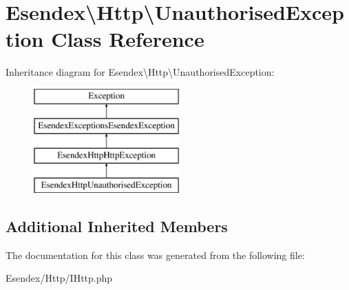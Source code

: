 \section{Esendex\textbackslash{}Http\textbackslash{}Unauthorised\-Exception Class Reference}
\label{class_esendex_1_1_http_1_1_unauthorised_exception}
Inheritance diagram for Esendex\textbackslash{}Http\textbackslash{}Unauthorised\-Exception\-:\begin{figure}[H]
\begin{center}
\leavevmode
\includegraphics[height=4.000000cm]{class_esendex_1_1_http_1_1_unauthorised_exception}
\end{center}
\end{figure}
\subsection*{Additional Inherited Members}


The documentation for this class was generated from the following file\-:\begin{DoxyCompactItemize}
\item 
Esendex/\-Http/I\-Http.\-php\end{DoxyCompactItemize}
